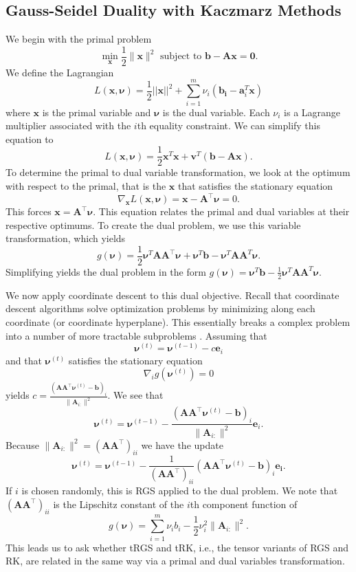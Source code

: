 \documentclass[10.5pt]{amsart}
\newcommand{\mat}[1]{\bm{#1}}
\def\va{{\bm{a}}}
\def\vb{{\bm{b}}}
\def\ve{{\bm{e}}}
\def\vx{{\bm{x}}}
\begin{document}
\subsection{Gauss-Seidel Duality with Kaczmarz Methods}

We begin with the primal problem  
\begin{equation}
    \min_{\vx} \frac{1}{2} \|{\bm{x}}\|^2 \text{ subject to } \bm{b}-\mat{A}\bm{x}=\bm{0}. \label{eq:primal}
\end{equation}  We define the Lagrangian $$L(\bm{x},\bm{\nu})=\frac{1}{2}||{\bm{x}}||^2 + \sum_{i=1}^{m}\nu_{i}(\bm{b_i}-\va_{i}^T\bm{x})$$ where $\bm{x}$ is the primal variable and $\bm{\nu}$ is the dual variable.  Each $\nu_{i}$ is a Lagrange multiplier associated with the $i$th equality constraint.  We can simplify this equation to $$L(\bm{x},\bm{\nu}) = \frac{1}{2}\bm{x}^T\bm{x}+\bm{v}^T(\bm{b}-\mat{A}\bm{x}).$$  To determine the primal to dual variable transformation, we look at the optimum with respect to the primal, that is the $\vx$ that satisfies the stationary equation $$\nabla_{\bm{x}}L(\bm{x},\bm{\nu})=\bm{x}-\mat{A}^\top\bm{\nu}=0.$$  This forces $\bm{x}=\mat{A}^\top\bm{\nu}.$  This equation relates the primal and dual variables at their respective optimums.
To create the dual problem, we use this variable transformation, which yields $$g(\bm{\nu}) = \frac{1}{2}\bm{\nu}^T\mat{A}\mat{A}^\top\bm{\nu} + \bm{\nu}^T\bm{b}-\bm{\nu}^T\mat{A}\mat{A}^T\bm{\nu}.$$  Simplifying yields the dual problem in the form $g(\bm{\nu}) = \bm{\nu}^T\bm{b}-\frac{1}{2}\bm{\nu}^T\mat{A}\mat{A}^T\bm{\nu}$.

We now apply coordinate descent to this dual objective.  Recall that coordinate descent algorithms solve optimization problems by minimizing along each coordinate (or coordinate hyperplane).  This essentially breaks a complex problem into a number of more tractable subproblems \cite{shi2016primer}.  Assuming that $$\bm{\nu}^{(t)} = \bm{\nu}^{(t-1)} - c \ve_i$$ and that $\bm{\nu}^{(t)}$ satisfies the stationary equation $$\nabla_i g(\bm{\nu}^{(t)}) = 0$$ yields $c = \frac{(\mat{A}\mat{A}^\top \bm{\nu}^{(t)} - \vb)_i}{\|\mat{A}_{i:}\|^2}$.  We see that $$\bm{\nu}^{(t)}= \bm{\nu}^{(t-1)}-\frac{(\mat{A}\mat{A}^\top \bm{\nu}^{(t)} - \vb)_i}{\|\mat{A}_{i:}\|^2}\ve_i.$$  Because $\|\mat{A}_{i:}\|^2=(\mat{A}\mat{A}^\top)_{ii}$  we have the update 
$$\bm{\nu}^{(t)}= \bm{\nu}^{(t-1)}-\frac{1}{(\mat{A}\mat{A}^\top)_{ii}}(\mat{A}\mat{A}^\top \bm{\nu}^{(t)} - \vb)_i\bm{e_i}.$$
If $i$ is chosen randomly, this is RGS applied to the dual problem.
We note that $(\mat{A}\mat{A}^\top)_{ii}$ is the Lipschitz constant of the $i$th component function of $$g(\bm{\nu}) = \sum_{i=1}^m \nu_i b_i - \frac12 \nu_i^2 \|\mat{A}_{i:}\|^2.$$
This leads us to ask whether tRGS and tRK, i.e., the tensor variants of RGS and RK, are related in the same way via a primal and dual variables transformation.
\end{document}
